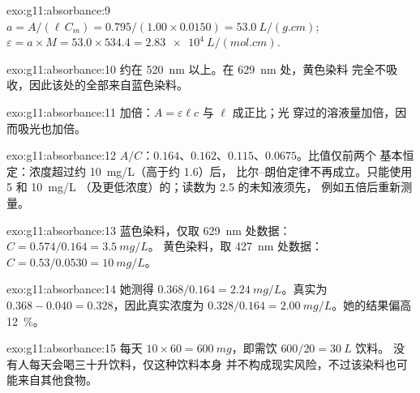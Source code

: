 \begin{solution}{exo:g11:absorbance:9}
$a = A / (\ell\, C_m) = 0.795 / (1.00 \times 0.0150) = \qty{53.0}{L/(g.cm)}$;
$\varepsilon = a \times M = 53.0 \times 534.4 = \qty{2.83e4}{L/(mol.cm)}$.
\end{solution}

\begin{solution}{exo:g11:absorbance:10}
约在 \qty{520}{nm} 以上。在 \qty{629}{nm} 处，黄色染料
完全不吸收，因此该处的全部来自蓝色染料。
\end{solution}

\begin{solution}{exo:g11:absorbance:11}
加倍：$A = \varepsilon \ell c$ 与 $\ell$ 成正比；光
穿过的溶液量加倍，因而吸光也加倍。
\end{solution}

\begin{solution}{exo:g11:absorbance:12}
$A/C$：$0.164$、$0.162$、$0.115$、$0.0675$。比值仅前两个
基本恒定：浓度超过约 \qty{10}{mg/L}（高于约 1.6）后，
比尔–朗伯定律不再成立。只能使用 5 和 \qty{10}{mg/L}
（及更低浓度）的；读数为 2.5 的未知液须先，
例如五倍后重新测量。
\end{solution}

\begin{solution}{exo:g11:absorbance:13}
蓝色染料，仅取 \qty{629}{nm} 处数据：$C = 0.574 / 0.164 = \qty{3.5}{mg/L}$。
黄色染料，取 \qty{427}{nm} 处数据：$C = 0.53 / 0.0530 = \qty{10}{mg/L}$。
\end{solution}

\begin{solution}{exo:g11:absorbance:14}
她测得 $0.368 / 0.164 = \qty{2.24}{mg/L}$。真实为
$0.368 - 0.040 = 0.328$，因此真实浓度为
$0.328 / 0.164 = \qty{2.00}{mg/L}$。她的结果偏高 \qty{12}{\percent}。
\end{solution}

\begin{solution}{exo:g11:absorbance:15}
每天 $10 \times 60 = \qty{600}{mg}$，即需饮 $600 / 20 = \qty{30}{L}$ 饮料。
没有人每天会喝三十升饮料，仅这种饮料本身
并不构成现实风险，不过该染料也可能来自其他食物。
\end{solution}

